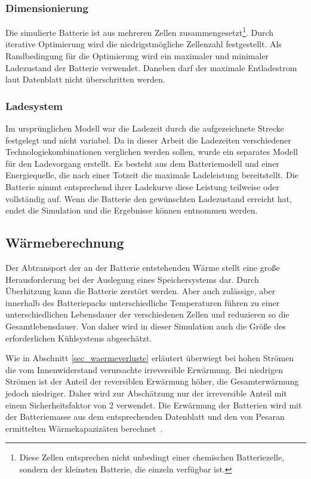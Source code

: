 \subsubsection{Dimensionierung}
Die simulierte Batterie ist aus mehreren Zellen zusammengesetzt\footnote{Diese Zellen entsprechen nicht unbedingt einer chemischen Batteriezelle, sondern der kleinsten Batterie, die einzeln verfügbar ist.}. Durch iterative Optimierung wird die niedrigstmögliche Zellenzahl festgestellt. Als Randbedingung für die Optimierung wird ein maximaler und minimaler Ladezustand der Batterie verwendet. Daneben darf der maximale Entladestrom laut Datenblatt nicht überschritten werden.

\subsubsection{Ladesystem}
Im ursprünglichen Modell war die Ladezeit durch die aufgezeichnete Strecke festgelegt und nicht variabel. Da in dieser Arbeit die Ladezeiten verschiedener Technologiekombinationen verglichen werden sollen, wurde ein separates Modell für den Ladevorgang erstellt. Es besteht aus dem Batteriemodell und einer Energiequelle, die nach einer Totzeit die maximale Ladeleistung bereitstellt. Die Batterie nimmt entsprechend ihrer Ladekurve diese Leistung teilweise oder vollständig auf. Wenn die Batterie den gewünschten Ladezustand erreicht hat, endet die Simulation und die Ergebnisse können entnommen werden.

\subsection{Wärmeberechnung}
Der Abtransport der an der Batterie entstehenden Wärme stellt eine große Herausforderung bei der Auslegung eines Speichersystems dar. Durch Überhitzung kann die Batterie zerstört werden. Aber auch zulässige, aber innerhalb des Batteriepacks unterschiedliche Temperaturen führen zu einer unterschiedlichen Lebensdauer der verschiedenen Zellen und reduzieren so die Gesamtlebensdauer. Von daher wird in dieser Simulation auch die Größe des erforderlichen Kühlsystems abgeschätzt.

Wie in Abschnitt \ref{sec_waermeverluste} erläutert überwiegt bei hohen Strömen die vom Innenwiderstand verursachte irreversible Erwärmung. Bei niedrigen Strömen ist der Anteil der reversiblen Erwärmung höher, die Gesamterwärmung jedoch niedriger. Daher wird zur Abschätzung nur der irreversible Anteil mit einem Sicherheitsfaktor von 2 verwendet. Die Erwärmung der Batterien wird mit der Batteriemasse aus dem entsprechenden Datenblatt und den von Pesaran ermittelten Wärmekapazizäten berechnet~\cite{pesaran2001battery}.

